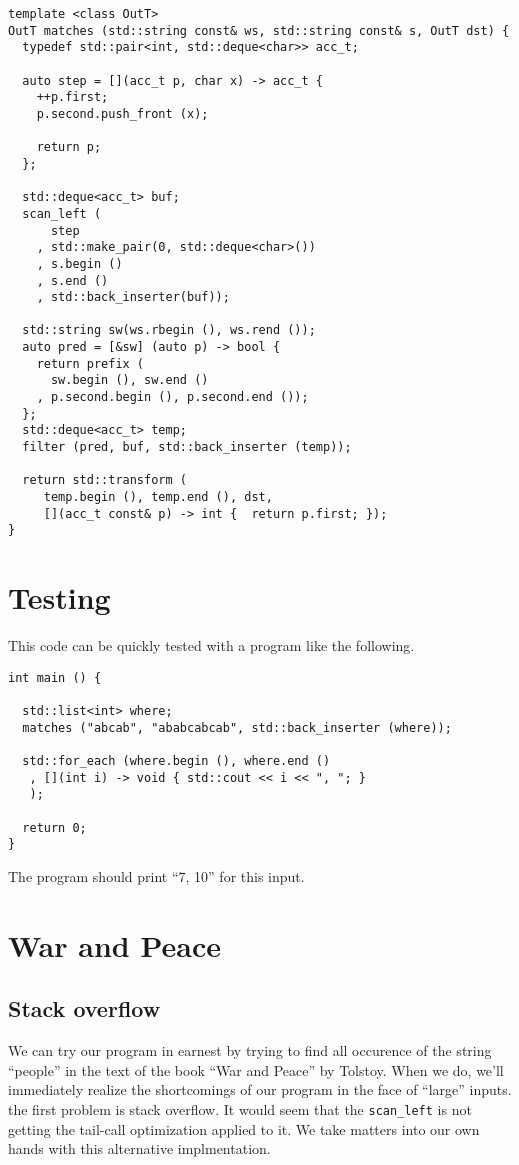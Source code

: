 \documentclass{article}
\begin{document}
\begin{verbatim}
template <class OutT>
OutT matches (std::string const& ws, std::string const& s, OutT dst) {
  typedef std::pair<int, std::deque<char>> acc_t;

  auto step = [](acc_t p, char x) -> acc_t {
    ++p.first;
    p.second.push_front (x);

    return p;
  };

  std::deque<acc_t> buf;
  scan_left (
      step
    , std::make_pair(0, std::deque<char>())
    , s.begin ()
    , s.end ()
    , std::back_inserter(buf));

  std::string sw(ws.rbegin (), ws.rend ());
  auto pred = [&sw] (auto p) -> bool { 
    return prefix (
      sw.begin (), sw.end ()
    , p.second.begin (), p.second.end ()); 
  };
  std::deque<acc_t> temp;
  filter (pred, buf, std::back_inserter (temp));

  return std::transform (
     temp.begin (), temp.end (), dst, 
     [](acc_t const& p) -> int {  return p.first; });
}
\end{verbatim}
\section{Testing}
This code can be quickly tested with a program like the following.
\begin{verbatim}
int main () {

  std::list<int> where;
  matches ("abcab", "ababcabcab", std::back_inserter (where));

  std::for_each (where.begin (), where.end ()
   , [](int i) -> void { std::cout << i << ", "; }
   );  

  return 0;
}
\end{verbatim}
The program should print ``7, 10'' for this input.

\section{War and Peace}

\subsection{Stack overflow}
We can try our program in earnest by trying to find all occurence of
the string ``people'' in the text of the book ``War and Peace'' by
Tolstoy. When we do, we'll immediately realize the shortcomings of our
program in the face of ``large'' inputs. the first problem is stack
overflow. It would seem that the \verb|scan_left| is not getting the
tail-call optimization applied to it. We take matters into our own
hands with this alternative implmentation.
\end{document}
